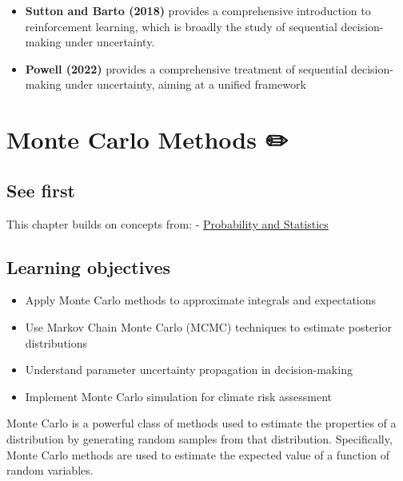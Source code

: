 \documentclass[
  letterpaper,
  DIV=11,
  numbers=noendperiod]{scrreprt}
\providecommand{\tightlist}{%
  \setlength{\itemsep}{0pt}\setlength{\parskip}{0pt}}
\begin{document}

\begin{itemize}
\tightlist
\item
  \textbf{Sutton and Barto (2018)} provides a comprehensive introduction
  to reinforcement learning, which is broadly the study of sequential
  decision-making under uncertainty.
\item
  \textbf{Powell (2022)} provides a comprehensive treatment of
  sequential decision-making under uncertainty, aiming at a unified
  framework
\end{itemize}

\chapter{Monte Carlo Methods ✏️}\label{monte-carlo-methods}

\section*{See first}\label{see-first-1}


This chapter builds on concepts from: -
\href{./chapters/fundamentals/probability-stats.qmd}{Probability and
Statistics}

\section*{Learning objectives}\label{learning-objectives-3}


\begin{itemize}
\tightlist
\item
  Apply Monte Carlo methods to approximate integrals and expectations
\item
  Use Markov Chain Monte Carlo (MCMC) techniques to estimate posterior
  distributions
\item
  Understand parameter uncertainty propagation in decision-making
\item
  Implement Monte Carlo simulation for climate risk assessment
\end{itemize}

Monte Carlo is a powerful class of methods used to estimate the
properties of a distribution by generating random samples from that
distribution. Specifically, Monte Carlo methods are used to estimate the
expected value of a function of random variables.
\end{document}
